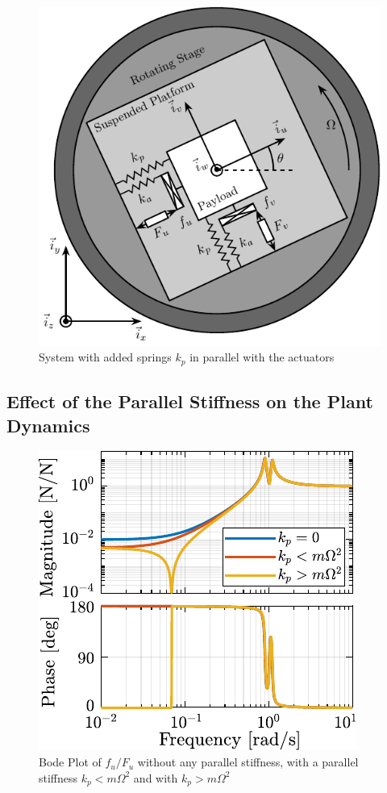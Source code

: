 \documentclass{ISMA_USD2020}
\begin{document}
\begin{figure}[htbp]
\centering
\includegraphics[scale=1]{figs/system_parallel_springs.pdf}
\caption{\label{fig:system_parallel_springs}System with added springs \(k_p\) in parallel with the actuators}
\end{figure}


\subsection{Effect of the Parallel Stiffness on the Plant Dynamics}
\label{sec:org4d37cce}

\begin{figure}[htbp]
\centering
\includegraphics[scale=1]{figs/plant_iff_kp.pdf}
\caption{\label{fig:plant_iff_kp}Bode Plot of \(f_u/F_u\) without any parallel stiffness, with a parallel stiffness \(k_p < m \Omega^2\) and with \(k_p > m \Omega^2\)}
\end{figure}
\end{document}
